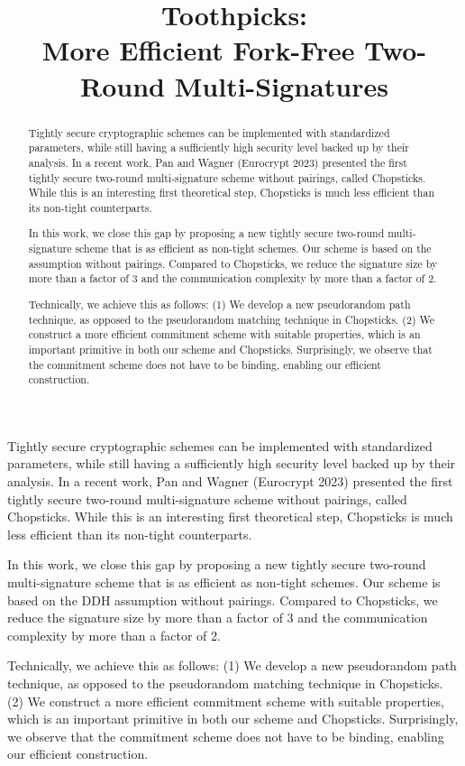 \documentclass[version=final]{iacrcc}
\title{Toothpicks: \\ More Efficient Fork-Free Two-Round Multi-Signatures}
\theoremstyle{mytheorem}				\newtheorem{theorem}{Theorem}
\theoremstyle{myplain}
\theoremstyle{mydefinition}
\theoremstyle{myremark}
\begin{document}
\maketitle
{}
\begin{abstract}
Tightly secure cryptographic schemes can be implemented with standardized parameters, while still having a sufficiently high security level backed up by their analysis.
In a recent work, Pan and Wagner (Eurocrypt 2023) presented the first tightly secure two-round multi-signature scheme without pairings, called Chopsticks.
While this is an interesting first theoretical step, Chopsticks is much less efficient than its non-tight counterparts.

\quad In this work, we close this gap by proposing a new tightly secure two-round multi-signature scheme that is as efficient as non-tight schemes. 
Our scheme is based on the \ddh assumption without pairings.
Compared to Chopsticks, we reduce the signature size by more than a factor of 3 and the communication complexity by more than a factor of 2.

\quad Technically, we achieve this as follows: (1) We develop a new pseudorandom path technique, as opposed to the pseudorandom matching technique in Chopsticks. (2) We construct a more efficient commitment scheme with suitable properties, which is an important primitive in both our scheme and Chopsticks. 
Surprisingly, we observe that the commitment scheme does not have to be binding, enabling our efficient construction. 

\end{abstract}
\begin{textabstract}
Tightly secure cryptographic schemes can be implemented with standardized parameters, while still having a sufficiently high security level backed up by their analysis.
In a recent work, Pan and Wagner (Eurocrypt 2023) presented the first tightly secure two-round multi-signature scheme without pairings, called Chopsticks.
While this is an interesting first theoretical step, Chopsticks is much less efficient than its non-tight counterparts.

In this work, we close this gap by proposing a new tightly secure two-round multi-signature scheme that is as efficient as non-tight schemes. 
Our scheme is based on the DDH assumption without pairings.
Compared to Chopsticks, we reduce the signature size by more than a factor of 3 and the communication complexity by more than a factor of 2.

Technically, we achieve this as follows: (1) We develop a new pseudorandom path technique, as opposed to the pseudorandom matching technique in Chopsticks. (2) We construct a more efficient commitment scheme with suitable properties, which is an important primitive in both our scheme and Chopsticks. 
Surprisingly, we observe that the commitment scheme does not have to be binding, enabling our efficient construction. 

\end{textabstract}
\end{document}
